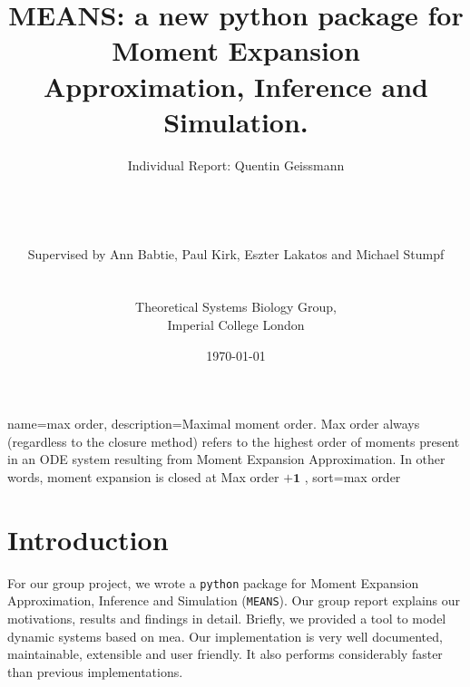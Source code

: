 \documentclass[11pt,a4paper]{article}
\newcommand{\means}{\texttt{MEANS}}
\newcommand{\py}{\texttt{python}}
\begin{document}
\listoftodos
\newpage

\title{MEANS: a new python package for Moment Expansion Approximation, Inference and Simulation.\\
}
\author{Individual Report: Quentin Geissmann\\
\\    
\\
\\
\\
Supervised by Ann Babtie, Paul Kirk, Eszter Lakatos and Michael Stumpf\\
\\
\\
Theoretical Systems Biology Group,\\
Imperial College London
}
\date{\today}

\clearpage\maketitle
\thispagestyle{empty}
\newpage{}



\tableofcontents


{
  name=max order,
  description={Maximal moment order. Max order always (regardless to the closure method) refers to the highest order of
  moments present in an ODE system resulting from Moment Expansion Approximation. In other words, moment expansion is closed at Max order $\mathbf{+1}$
   },
  sort=max order
}

\newpage{}
\printglossaries
\newpage{}

\section{Introduction}

For our group project, we wrote a \py{} package for Moment Expansion Approximation, Inference and Simulation (\means).
Our group report explains our motivations, results and findings in detail.
Briefly, we provided a tool to model dynamic systems based on \acrlong{mea}\cite{ale_general_2013}.
Our implementation is very well documented, maintainable, extensible and user friendly.
It also performs considerably faster than previous implementations.
\end{document}
